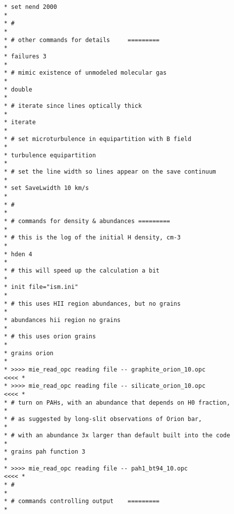 {\begin{verbatim}
* set nend 2000                                                                   *
* #                                                                               *
* # other commands for details     =========                                      *
* failures 3                                                                      *
* # mimic existence of unmodeled molecular gas                                    *
* double                                                                          *
* # iterate since lines optically thick                                           *
* iterate                                                                         *
* # set microturbulence in equipartition with B field                             *
* turbulence equipartition                                                        *
* # set the line width so lines appear on the save continuum                     *
* set SaveLwidth 10 km/s                                                         *
* #                                                                               *
* # commands for density & abundances =========                                   *
* # this is the log of the initial H density, cm-3                                *
* hden 4                                                                          *
* # this will speed up the calculation a bit                                      *
* init file="ism.ini"                                                             *
* # this uses HII region abundances, but no grains                                *
* abundances hii region no grains                                                 *
* # this uses orion grains                                                        *
* grains orion                                                                    *
* >>>> mie_read_opc reading file -- graphite_orion_10.opc                    <<<< *
* >>>> mie_read_opc reading file -- silicate_orion_10.opc                    <<<< *
* # turn on PAHs, with an abundance that depends on H0 fraction,                  *
* # as suggested by long-slit observations of Orion bar,                          *
* # with an abundance 3x larger than default built into the code                  *
* grains pah function 3                                                           *
* >>>> mie_read_opc reading file -- pah1_bt94_10.opc                         <<<< *
* #                                                                               *
* # commands controlling output    =========                                      *

\end{verbatim}}
